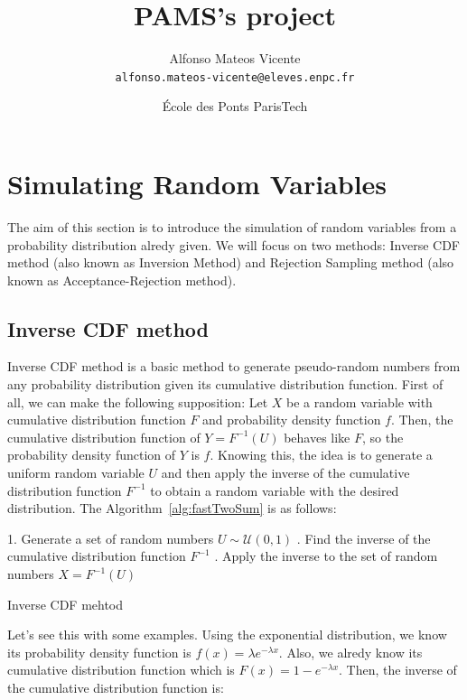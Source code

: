 \documentclass{article}
\title{PAMS's project} %
\author{Alfonso Mateos Vicente\\ \texttt{alfonso.mateos-vicente@eleves.enpc.fr}} %
\date{École des Ponts ParisTech} %
\begin{document}
\maketitle %

\section{Simulating Random Variables} %

The aim of this section is to introduce the simulation of random variables from a probability distribution alredy given. We will focus on two methods: Inverse CDF method (also known as Inversion Method) and Rejection Sampling method (also known as Acceptance-Rejection method).

\subsection{Inverse CDF method}

Inverse CDF method is a basic method to generate pseudo-random numbers from any probability distribution given its cumulative distribution function. First of all, we can make the following supposition: Let \(X\) be a random variable with cumulative distribution function \(F\) and probability density function \(f\). Then, the cumulative distribution function of \(Y = F^{-1}(U)\) behaves like \(F\), so the probability density function of \(Y\) is \(f\). Knowing this, the idea is to generate a uniform random variable \(U\) and then apply the inverse of the cumulative distribution function \(F^{-1}\) to obtain a random variable with the desired distribution. The Algorithm~\ref{alg:fastTwoSum} is as follows:

\begin{center}
	\begin{minipage}{0.7\linewidth} %
		\begin{algorithm}[H]
			1. Generate a set of random numbers \(U \sim \mathcal{U}(0,1)\) . Find the inverse of the cumulative distribution function \(F^{-1}\) . Apply the inverse to the set of random numbers \(X = F^{-1}(U)\) \;
			\caption{Inverse CDF mehtod} %
			\label{alg:fastTwoSum}   %
		\end{algorithm}
	\end{minipage}
\end{center}

Let's see this with some examples. Using the exponential distribution, we know its probability density function is \(f(x) = \lambda e^{-\lambda x}\).  Also, we alredy know its cumulative distribution function which is \(F(x) = 1 - e^{-\lambda x}\). Then, the inverse of the cumulative distribution function is:
\end{document}
